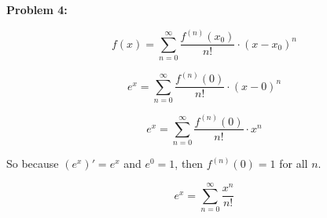 \textbf{Problem 4:}

\singlespacing

\[ f(x) = \sum_{n=0}^{\infty} \frac{f^{(n)}(x_0)}{n!}\cdot(x - x_0)^n \]

\[ e^x = \sum_{n=0}^{\infty} \frac{f^{(n)}(0)}{n!}\cdot(x - 0)^n \]

\[ e^x = \sum_{n=0}^{\infty} \frac{f^{(n)}(0)}{n!}\cdot x^n \]

\singlespacing

\centering
So because $(e^x)' = e^x$ and $e^0 = 1$, then $f^{(n)}(0) = 1$ for all $n$.


\[ e^x = \sum_{n=0}^{\infty} \frac{x^n}{n!} \]